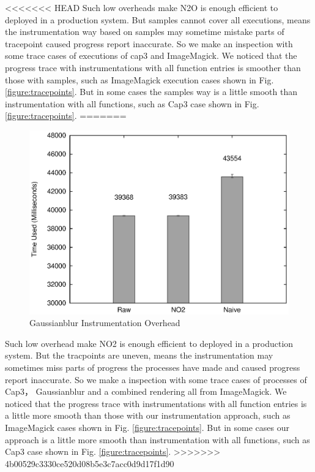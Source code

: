 <<<<<<< HEAD
Such low overheads make N2O is enough efficient to deployed in a production system. But samples cannot cover all executions, means the instrumentation way based on samples may sometime mistake parts of tracepoint caused progress report inaccurate. So we make an inspection with some trace cases of executions of cap3 and ImageMagick. We noticed that the progress trace with instrumentations with all function entries is smoother than those with samples, such as ImageMagick execution cases shown in Fig. \ref{figure:tracepoints}. But in some cases the samples way is a little smooth than instrumentation with all functions, such as Cap3 case shown in Fig. \ref{figure:tracepoints}.
=======
\begin{figure}
\centering
  \includegraphics[width=0.9\columnwidth]{figures/overhead_gaussianblur.eps}
\caption{Gaussianblur Instrumentation Overhead}
\label{figure:overhead_gaussianblur}
\end{figure}

Such low overhead make NO2 is enough efficient to deployed in a production system. But the tracpoints are uneven, means the instrumentation may sometimes miss parts of progress the processes have made and caused progress report inaccurate. So we make a inspection with some trace cases of processes of Cap3， Gaussianblur and a combined rendering all from ImageMagick. We noticed that the progress trace with instrumentations with all function entries is a little more smooth than those with our instrumentation approach, such as ImageMagick cases shown in Fig. \ref{figure:tracepoints}. But in some cases our approach is a little more smooth than instrumentation with all functions, such as Cap3 case shown in Fig. \ref{figure:tracepoints}.
>>>>>>> 4b00529c3330ce520d08b5e3c7acc0d9d17f1d90

